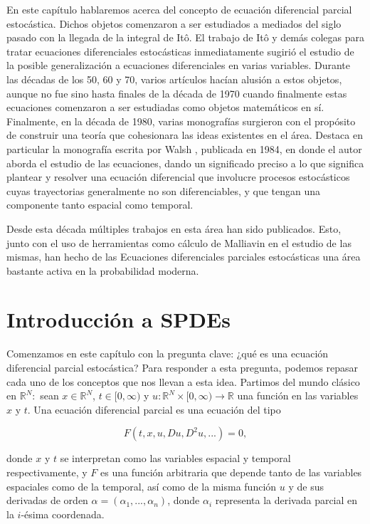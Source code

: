 \documentclass[letterpaper,twoside,12pt]{book}
\newcommand{\R}{\mathbb{R}}
\newcommand{\1}{\mathds{1}}
\renewcommand{\to}{\rightarrow}
\theoremstyle{definition}
\theoremstyle{definition}
\theoremstyle{definition}
\theoremstyle{definition}
\theoremstyle{definition}
\theoremstyle{definition}
\theoremstyle{definition}
\begin{document}
En este capítulo hablaremos acerca del concepto de ecuación diferencial parcial estocástica.
Dichos objetos comenzaron a ser estudiados a mediados del siglo pasado con la llegada de la integral de Itô.
El trabajo de Itô y demás colegas para tratar ecuaciones diferenciales estocásticas inmediatamente sugirió el estudio de la posible generalización a ecuaciones diferenciales en varias variables.
Durante las décadas de los 50, 60 y 70, varios artículos hacían alusión a estos objetos, aunque no fue sino hasta finales de la década de 1970 cuando finalmente estas ecuaciones comenzaron a ser estudiadas como objetos matemáticos en sí.
Finalmente, en la década de 1980, varias monografías surgieron con el propósito de construir una teoría que cohesionara las ideas existentes en el área. Destaca en particular la monografía escrita por Walsh \cite{Walsh_J.B_Introduction_to_SPDEs}, publicada en 1984, en donde el autor aborda el estudio de las ecuaciones, dando un significado preciso a lo que significa plantear y resolver una ecuación diferencial que involucre procesos estocásticos cuyas trayectorias generalmente no son diferenciables, y que tengan una componente tanto espacial como temporal.

Desde esta década múltiples trabajos en esta área han sido publicados. Esto, junto con el uso de herramientas como cálculo de Malliavin en el estudio de las mismas, han hecho de las Ecuaciones diferenciales parciales estocásticas una área bastante activa en la probabilidad moderna. 
\section{Introducción a SPDEs}
Comenzamos en este capítulo con la pregunta clave: ¿qué es una ecuación diferencial parcial estocástica? Para responder a esta pregunta, podemos repasar cada uno de los conceptos que nos llevan a esta idea. Partimos del mundo clásico en $\R^{N}:$ sean $x\in \R^{N}$, $t\in [0,\infty)$ y $u:\R^{N}\times[0,\infty)\to \R$ una función en las variables $x$ y $t$. Una ecuación diferencial parcial es una ecuación del tipo 

\begin{equation}\label{ec_dif_parc}
    F(t,x,u,Du,D^2u,...)=0,    
\end{equation}

donde $x$ y $t$ se interpretan como las variables espacial y temporal respectivamente, y $F$ es una función arbitraria que depende tanto de las variables espaciales como de la temporal, así como de la misma función $u$ y de sus derivadas de orden $\alpha=(\alpha_1,...,\alpha_n)$, donde $\alpha_i$ representa la derivada parcial en la $i$-ésima coordenada.
\end{document}
